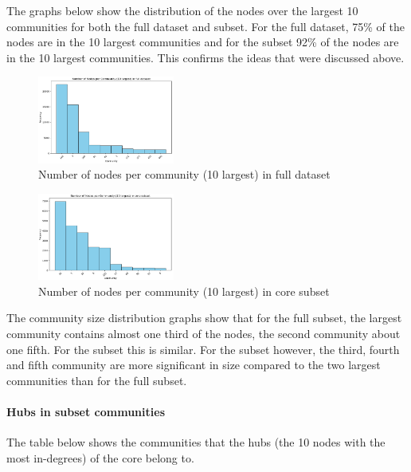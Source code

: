 \documentclass[conference]{IEEEtran}
\begin{document}
The graphs below show the distribution of the nodes over the largest 10 communities for both the full dataset and subset. For the full dataset, 75\% of the nodes are in the 10 largest communities and for the subset 92\% of the nodes are in the 10 largest communities. This confirms the ideas that were discussed above. 

\begin{figure}[H]
    \centerline{\includegraphics[width=0.4\textwidth]{img/louvain_network.png}}
    \centering
    \caption{Number of nodes per community (10 largest) in full dataset}
    \label{fig:ego18core}
\end{figure}

\begin{figure}[H]
    \centerline{\includegraphics[width=0.4\textwidth]{img/louvain_core.png}}
    \centering
    \caption{Number of nodes per community (10 largest) in core subset}
    \label{fig:ego18core}
\end{figure}

The community size distribution graphs show that for the full subset, the largest community contains almost one third of the nodes, the second community about one fifth. For the subset this is similar. For the subset however, the third, fourth and fifth community are more significant in size compared to the two largest communities than for the full subset.

\paragraph{Hubs in subset communities}
The table below shows the communities that the hubs (the 10 nodes with the most in-degrees) of the core belong to. 
\end{document}
